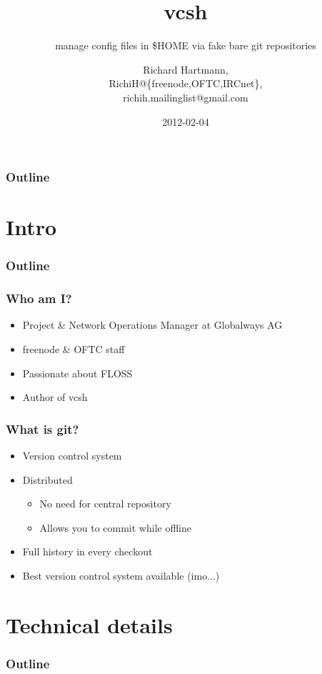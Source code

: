 \documentclass[t]{beamer}
\title{vcsh}
\subtitle{manage config files in \$HOME via fake bare git repositories}
\author{Richard Hartmann,\\
RichiH@\{freenode,OFTC,IRCnet\},\\
richih.mailinglist@gmail.com}
\date{2012-02-04}
\begin{document}
\begin{frame}
	\titlepage
\end{frame}

\begin{frame}
	\frametitle{Outline}
	\tableofcontents
\end{frame}


\section{Intro}

\begin{frame}
	\frametitle{Outline}
	\tableofcontents[currentsection]
\end{frame}

\begin{frame}
	\frametitle{Who am I?}
	\begin{itemize}
		\item Project \& Network Operations Manager at Globalways AG
		\item freenode \& OFTC staff
		\item Passionate about FLOSS
		\item Author of vcsh
	\end{itemize}
\end{frame}

\begin{frame}
	\frametitle{What is git?}
	\begin{itemize}
		\item Version control system
		\item Distributed
		\begin{itemize}
			\item No need for central repository
			\item Allows you to commit while offline
		\end{itemize}
		\item Full history in every checkout
		\item Best version control system available (imo...)
	\end{itemize}
\end{frame}


\section{Technical details}

\begin{frame}
	\frametitle{Outline}
	\tableofcontents[currentsection]
\end{frame}
\end{document}
